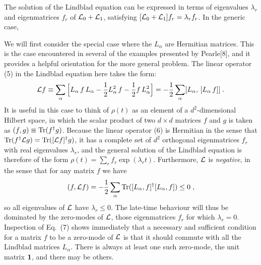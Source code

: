The solution of the Lindblad equation can be expressed in terms of eigenvalues $\lambda_r$ and eigenmatrices $f_r$ of ${\cal L}_0+{\cal L}_1$, satisfying $[{\cal L}_0+{\cal L}_1]f_r=\lambda_rf_r$.  In the generic case, 

We will first consider the special case where the $L_\alpha$ are Hermitian matrices.  This is the case encountered in several of the examples presented by Pearle[8], and it provides a helpful orientation for the more general problem.  The linear operator (5) in the Lindblad equation here takes the form:
\begin{equation}
{\cal L}f\equiv \sum_\alpha \Big[L_\alpha\,f\,L_\alpha
-\frac{1}{2}L_\alpha^2\,f
-\frac{1}{2}f\,L_\alpha^2\Big]=-\frac{1}{2}\sum_\alpha[L_\alpha,\,[L_\alpha\,f]]\;.
\end{equation}  
It is useful in this case to think of $ \rho(t)$ as an element of a $d^2$-dimensional Hilbert space, in which the scalar product of two $d\times d$ matrices $f$ and $g$ is taken as $(f,g)\equiv {\rm Tr}(f^\dagger g)$.  
Because the linear operator (6) is Hermitian in the sense that ${\rm Tr}(f^\dagger{\cal L} g)={\rm Tr}([{\cal L}f]^\dagger g)$, it has a complete set of $d^2$ orthogonal eigenmatrices $f_r$ with real eigenvalues $\lambda_r$, and the general solution of the Lindblad equation is therefore of the form
$\rho(t)=\sum_r f_r\exp(\lambda_r t)$.  Furthermore, ${\cal L}$ is {\em negative}, in the sense that for any matrix $f$ we have 
\begin{equation}
(f,{\cal L}f)=-\frac{1}{2}\sum_\alpha {\rm Tr}([L_\alpha,f]^\dagger [L_\alpha,f])\leq 0\;,
\end{equation}
so all eigenvalues of ${\cal L}$ have $\lambda_r\leq 0$.  The late-time behaviour will thus be dominated by the zero-modes of ${\cal L}$, those eigenmatrices $f_r$ for which $\lambda_r=0$.  Inspection of Eq.~(7) shows immediately that a necessary and sufficient condition for a matrix $f$ to be a zero-mode of ${\cal L}$ is that it should commute with all the Lindblad matrices $L_\alpha$.  There is always at least one such zero-mode, the unit matrix $\mbox{\boldmath{$1$}}$, and there may be others.  






